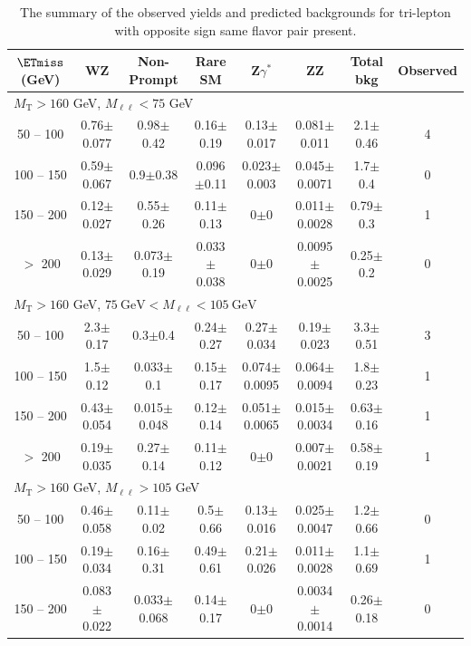 \begin{landscape}
\begin{table}
\begin{center}
\caption{\label{tab:OSSF1tau0} The summary of the observed yields and predicted backgrounds for tri-lepton 
with opposite sign same flavor pair present. }
\begin{tabular}{| c | c c c c c c c | }\hline\hline
$\ETmiss$ (GeV) & WZ & Non-Prompt & Rare SM & Z$\gamma^*$ & ZZ & Total bkg & Observed\\\hline\hline
\multicolumn{8}{l}{$M_{\text{T}} > 160$ GeV, $M_{\ell\ell} < 75$ GeV}\\\hline\hline
50 -- 100&0.76$\pm$0.077&0.98$\pm$0.42&0.16$\pm$0.19&0.13$\pm$0.017&0.081$\pm$0.011&2.1$\pm$0.46&4\\
100 -- 150&0.59$\pm$0.067&0.9$\pm$0.38&0.096$\pm$0.11&0.023$\pm$0.003&0.045$\pm$0.0071&1.7$\pm$0.4&0\\
150 -- 200&0.12$\pm$0.027&0.55$\pm$0.26&0.11$\pm$0.13&0$\pm$0&0.011$\pm$0.0028&0.79$\pm$0.3&1\\
$>$ 200&0.13$\pm$0.029&0.073$\pm$0.19&0.033$\pm$0.038&0$\pm$0&0.0095$\pm$0.0025&0.25$\pm$0.2&0\\
\hline\hline
\multicolumn{8}{l}{$M_{\text{T}} > 160$ GeV, $75~\mathrm{GeV} < M_{\ell\ell} < 105~\mathrm{GeV}$}\\\hline\hline
50 -- 100&2.3$\pm$0.17&0.3$\pm$0.4&0.24$\pm$0.27&0.27$\pm$0.034&0.19$\pm$0.023&3.3$\pm$0.51&3\\
100 -- 150&1.5$\pm$0.12&0.033$\pm$0.1&0.15$\pm$0.17&0.074$\pm$0.0095&0.064$\pm$0.0094&1.8$\pm$0.23&1\\
150 -- 200&0.43$\pm$0.054&0.015$\pm$0.048&0.12$\pm$0.14&0.051$\pm$0.0065&0.015$\pm$0.0034&0.63$\pm$0.16&1\\
$>$ 200&0.19$\pm$0.035&0.27$\pm$0.14&0.11$\pm$0.12&0$\pm$0&0.007$\pm$0.0021&0.58$\pm$0.19&1\\
\hline\hline
\multicolumn{8}{l}{$M_{\text{T}} > 160$ GeV, $M_{\ell\ell} > 105$ GeV}\\\hline\hline
50 -- 100&0.46$\pm$0.058&0.11$\pm$0.02&0.5$\pm$0.66&0.13$\pm$0.016&0.025$\pm$0.0047&1.2$\pm$0.66&0\\
100 -- 150&0.19$\pm$0.034&0.16$\pm$0.31&0.49$\pm$0.61&0.21$\pm$0.026&0.011$\pm$0.0028&1.1$\pm$0.69&1\\
150 -- 200&0.083$\pm$0.022&0.033$\pm$0.068&0.14$\pm$0.17&0$\pm$0&0.0034$\pm$0.0014&0.26$\pm$0.18&0\\

\end{tabular}
\end{center}
\end{table}
\end{landscape}
